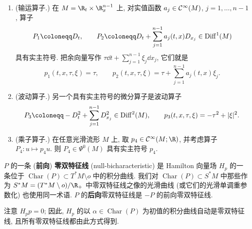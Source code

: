 \begin{example}[具有实主符号的算子]\label{eg:8.1}
\begin{enumerate}
    \item (输运算子.) 在 $M = \R_t \times \R^{n-1}_x$ 上, 对实值函数 $a_j \in \mathcal{C}^\infty(M)$, $j = 1, \ldots, n-1$, 算子
    \begin{equation}\label{eq:8.3}
        P_1 \defeq D_t, \qquad P_2 \defeq D_t + \sum_{j=1}^{n-1} a_j(t, x) D_{x_j} \in \operatorname{Diff}^1(M)
    \end{equation}
    具有实主符号. 把余向量写作 $\tau \dd t + \sum_{j=1}^{n-1} \xi_j \dd x_j$, 它们就是
    \begin{equation}\label{eq:8.4}
        p_1(t, x, \tau, \xi) = \tau, \qquad p_2(t, x, \tau, \xi) = \tau + \sum_{j=1}^{n-1} a_j(t, x)\xi_j.
    \end{equation}
    \item (波动算子.) 另一个具有实主符号的微分算子是波动算子
    \begin{equation}\label{eq:8.5}
        P_3 \defeq -D_t^2 + \sum_{j=1}^{n-1} D_{x_j}^2 \in \operatorname{Diff}^2(M), \qquad p_3(t, x, \tau, \xi) = -\tau^2 + | \xi |^2.
    \end{equation}
    \item (乘子算子.) 在任意光滑流形 $M$ 上, 取 $p_4 \in \Smooth(M; \R)$, 并考虑算子 $P_4 \colon u \mapsto p_4 u$. 则 $P_4 \in \Psi^0(M)$ 具有实主符号 $p_4$.
\end{enumerate}
\end{example}

\begin{definition}[零双特征线]\label{def:8.2}
$P$ 的一条 (\textbf{前向}) \textbf{零双特征线} (null-bicharacteristic) 是 Hamilton 向量场 $H_p$ 的一条位于 $\operatorname{Char}(P) \subset T^*M \setminus o$ 中的积分曲线. 我们对 $\operatorname{Char}(P) \subset S^*M$ 中那些作为 $S^*M = (T^*M \setminus o)/\R_+$ 中零双特征线之像的光滑曲线 (或它们的光滑单调重参数化) 也使用同一术语. $P$ 的\textbf{后向}零双特征线是 $-P$ 的前向零双特征线.
\end{definition}

注意 $H_p p = 0$; 因此, $H_p$ 的以 $\alpha \in \operatorname{Char}(P)$ 为初值的积分曲线自动是零双特征线, 且所有零双特征线都由此方式得到.

